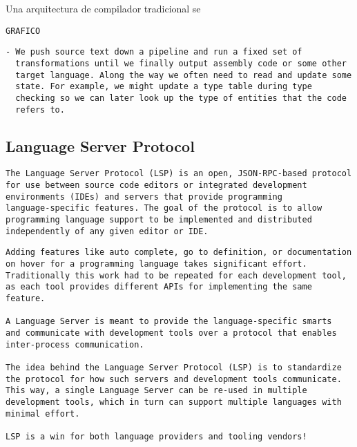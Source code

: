 \documentclass[12pt, a4paper]{report}
\begin{document}
Una arquitectura de compilador tradicional se

\noindent
\texttt{GRAFICO}

\begin{verbatim}
- We push source text down a pipeline and run a fixed set of
  transformations until we finally output assembly code or some other
  target language. Along the way we often need to read and update some
  state. For example, we might update a type table during type
  checking so we can later look up the type of entities that the code
  refers to.
\end{verbatim}

\subsection*{Language Server Protocol}

\begin{verbatim}
The Language Server Protocol (LSP) is an open, JSON-RPC-based protocol
for use between source code editors or integrated development
environments (IDEs) and servers that provide programming
language-specific features. The goal of the protocol is to allow
programming language support to be implemented and distributed
independently of any given editor or IDE.
\end{verbatim}

\begin{verbatim}
Adding features like auto complete, go to definition, or documentation
on hover for a programming language takes significant effort.
Traditionally this work had to be repeated for each development tool,
as each tool provides different APIs for implementing the same
feature.

A Language Server is meant to provide the language-specific smarts
and communicate with development tools over a protocol that enables
inter-process communication.

The idea behind the Language Server Protocol (LSP) is to standardize
the protocol for how such servers and development tools communicate.
This way, a single Language Server can be re-used in multiple
development tools, which in turn can support multiple languages with
minimal effort.

LSP is a win for both language providers and tooling vendors!
\end{verbatim}
\end{document}
